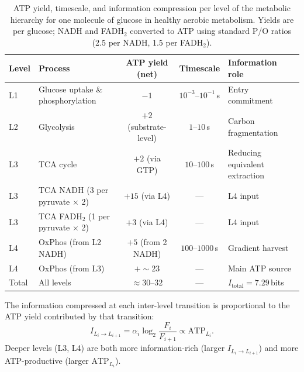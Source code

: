 \begin{table}[htbp]
\centering
\caption{ATP yield, timescale, and information compression per level of the
  metabolic hierarchy for one molecule of glucose in healthy aerobic
  metabolism. Yields are per glucose; NADH and FADH$_2$ converted to ATP
  using standard P/O ratios (2.5 per NADH, 1.5 per FADH$_2$).}
\label{tab:atp_per_level}
\begin{tabular}{llccl}
\toprule
Level & Process & ATP yield (net) & Timescale & Information role \\
\midrule
L1 & Glucose uptake \& phosphorylation & $-1$ & $10^{-3}$--$10^{-1}$\,s & Entry commitment \\
L2 & Glycolysis & $+2$ (substrate-level) & $1$--$10$\,s & Carbon fragmentation \\
L3 & TCA cycle & $+2$ (via GTP) & $10$--$100$\,s & Reducing equivalent extraction \\
L3 & TCA NADH (3 per pyruvate $\times$ 2) & $+15$ (via L4) & --- & L4 input \\
L3 & TCA FADH$_2$ (1 per pyruvate $\times$ 2) & $+3$ (via L4) & --- & L4 input \\
L4 & OxPhos (from L2 NADH) & $+5$ (from 2 NADH) & $100$--$1000$\,s & Gradient harvest \\
L4 & OxPhos (from L3) & $+\sim 23$ & --- & Main ATP source \\
\midrule
Total & All levels & $\approx 30$--$32$ & --- & $I_{\mathrm{total}} = 7.29$\,bits \\
\bottomrule
\end{tabular}
\end{table}

\begin{proposition}
\label{prop:atp_information}
The information compressed at each inter-level transition is proportional to
the ATP yield contributed by that transition:
\begin{equation}
  I_{L_i \to L_{i+1}} = \alpha_i \log_2 \frac{F_i}{F_{i+1}}
  \propto \mathrm{ATP}_{L_i}.
  \label{eq:atp_information}
\end{equation}
Deeper levels (L3, L4) are both more information-rich (larger
$I_{L_i \to L_{i+1}}$) and more ATP-productive (larger $\mathrm{ATP}_{L_i}$).
\end{proposition}

